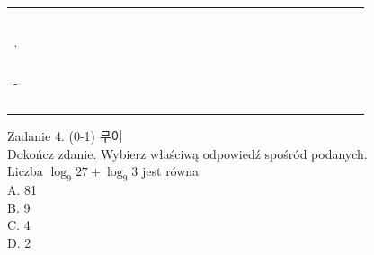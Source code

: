 \documentclass[10pt]{article}
\begin{document}
\begin{center}
\begin{tabular}{|c|c|c|c|c|c|c|c|c|c|c|c|c|c|c|c|c|c|c|c|c|c|c|c|c|c|c|c|}
\hline
 &  &  &  &  &  &  &  &  &  &  &  &  &  &  &  &  &  &  &  &  &  &  &  &  &  &  &  \\
\hline
 &  &  &  &  &  &  &  &  &  &  &  &  &  &  &  &  &  &  &  &  &  &  &  &  &  &  &  \\
\hline
 &  &  &  &  &  &  &  &  &  &  &  &  &  &  &  &  &  &  &  &  &  &  &  &  &  &  &  \\
\hline
 &  &  &  &  &  &  &  &  &  &  &  &  &  &  &  &  &  &  &  &  &  &  &  &  &  &  &  \\
\hline
 &  &  &  &  &  &  &  &  &  &  &  &  &  &  &  &  &  &  &  &  &  &  &  &  &  &  &  \\
\hline
 &  &  &  &  &  &  &  &  &  &  &  &  &  &  &  &  &  &  &  &  &  &  &  &  &  &  &  \\
\hline
. &  &  &  &  &  &  &  &  &  &  &  &  &  &  &  &  &  &  &  &  &  &  &  &  &  &  &  \\
\hline
 &  &  &  &  &  &  &  &  &  &  &  &  &  &  &  &  &  &  &  &  &  &  &  &  &  &  &  \\
\hline
 &  &  &  &  &  &  &  &  &  &  &  &  &  &  &  &  &  &  &  &  &  &  &  &  &  &  &  \\
\hline
 &  &  &  &  &  &  &  &  &  &  &  &  &  &  &  &  &  &  &  &  &  &  &  &  &  &  &  \\
\hline
 &  &  &  &  &  &  &  &  &  &  &  &  &  &  &  &  &  &  &  &  &  &  &  &  &  &  &  \\
\hline
- &  &  &  &  &  &  &  &  &  &  &  &  &  &  &  &  &  &  &  &  &  &  &  &  &  &  &  \\
\hline
 &  &  &  &  &  &  &  &  &  &  &  &  &  &  &  &  &  &  &  &  &  &  &  &  &  &  &  \\
\hline
 &  &  &  &  &  &  &  &  &  &  &  &  &  &  &  &  &  &  &  &  &  &  &  &  &  &  &  \\
\hline
 &  &  &  &  &  &  &  &  &  &  &  &  &  &  &  &  &  &  &  &  &  &  &  &  &  &  &  \\
\hline
 &  &  &  &  &  &  &  &  &  &  &  &  &  &  &  &  &  &  &  &  &  &  &  &  &  &  &  \\
\hline
\end{tabular}
\end{center}

Zadanie 4. (0-1) 무이\\
Dokończ zdanie. Wybierz właściwą odpowiedź spośród podanych.\\
Liczba \(\log _{9} 27+\log _{9} 3\) jest równa\\
A. 81\\
B. 9\\
C. 4\\
D. 2
\end{document}
